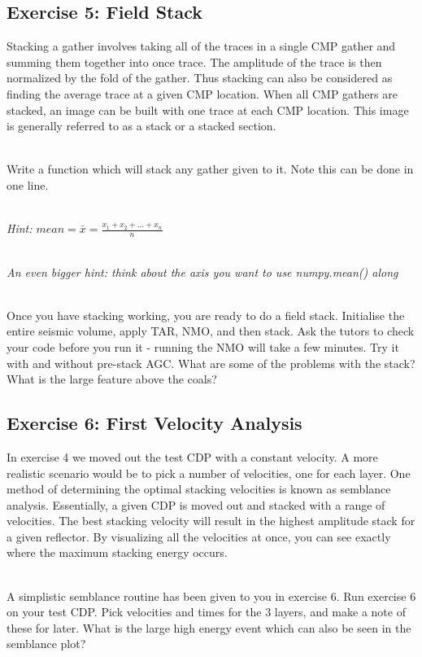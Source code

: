 \subsection*{Exercise 5: Field Stack}
Stacking a gather involves taking all of the traces in a single CMP gather and summing them together into once trace.  The amplitude of the trace is then normalized by the fold of the gather.  Thus stacking can also be considered as finding the average trace at a given CMP location.  When all CMP gathers are stacked, an image can be built with one trace at each CMP location.  This image is generally referred to as a stack or a stacked section.
\par~\\
Write a function which will stack any gather given to it.  Note this can be done in one line. 
\par~\\
\emph{Hint: $mean = \bar{x} = \frac{x_1 + x_2 + \ldots + x_n}{n}$}
\par~\\
\emph{An even bigger hint: think about the axis you want to use numpy.mean() along}
\par~\\
Once you have stacking working, you are ready to do a field stack.  Initialise the entire seismic volume, apply TAR, NMO, and then stack.  Ask the tutors to check your code before you run it - running the NMO will take a few minutes. Try it with and without pre-stack AGC. What are some of the problems with the stack? What is the large feature above the coals?
  

\subsection*{Exercise 6: First Velocity Analysis}
In exercise 4 we moved out the test CDP with a constant velocity.  A more realistic scenario would be to pick a number of velocities, one for each layer. One method of determining the optimal stacking velocities is known as semblance analysis.  Essentially, a given CDP is moved out and stacked with a range of velocities. The best stacking velocity will result in the highest amplitude stack for a given reflector.  By visualizing all the velocities at once, you can see exactly where the maximum stacking energy occurs.
\par~\\
A simplistic semblance routine has been given to you in exercise 6. Run exercise 6 on your test CDP. Pick velocities and times for the 3 layers, and make a note of these for later.  What is the large high energy event which can also be seen in the semblance plot?

